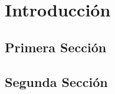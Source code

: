 \chapter{Introducción}
\lipsum[1-1]

\section{Primera Sección}
\lipsum[2-3]

\section{Segunda Sección}
\lipsum[4-5]